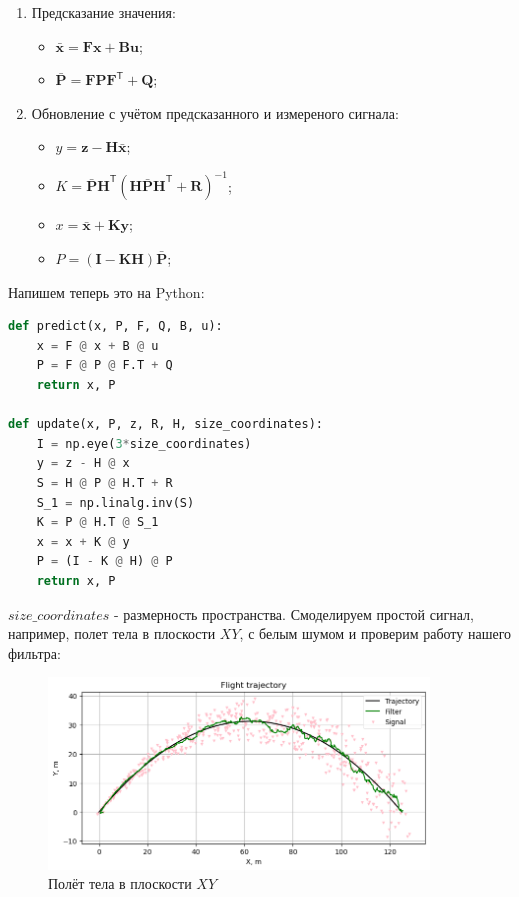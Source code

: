 \documentclass[a4paper,11pt]{article} %
\begin{document}
\begin{enumerate}
\item Предсказание значения:
\begin{itemize}
\item $\bar{\mathbf x} = \mathbf{Fx} + \mathbf{Bu}$;
\item $\bar{\mathbf P} = \mathbf{FPF}^\mathsf T + \mathbf Q$;
\end{itemize}
\item Обновление с учётом предсказанного и измереного сигнала:
\begin{itemize}
\item $y = \mathbf z - \mathbf{H\bar x}$;
\item $K = \mathbf{\bar{P}H}^\mathsf T (\mathbf{H\bar{P}H}^\mathsf T + \mathbf R)^{-1}$;
\item $x = \bar{\mathbf x} + \mathbf{Ky}$;
\item $P = (\mathbf I - \mathbf{KH})\mathbf{\bar{P}}$;
\end{itemize}
\end{enumerate}
Напишем теперь это на Python:
\begin{lstlisting}[label=some-code,caption=Filter Kalman, language=Python]
def predict(x, P, F, Q, B, u):
    x = F @ x + B @ u
    P = F @ P @ F.T + Q
    return x, P

def update(x, P, z, R, H, size_coordinates):
    I = np.eye(3*size_coordinates)
    y = z - H @ x
    S = H @ P @ H.T + R
    S_1 = np.linalg.inv(S)
    K = P @ H.T @ S_1
    x = x + K @ y
    P = (I - K @ H) @ P
    return x, P
\end{lstlisting}
$size\_coordinates$ - размерность пространства.
\newpage
Смоделируем простой сигнал,  например, полет тела в плоскости $XY$,  с белым шумом и проверим работу нашего фильтра:
\begin{figure}[h!]
\begin{center}
\includegraphics[width=0.9\textwidth]{images/kalmanfilter1.png}
\end{center}
\caption{Полёт тела в плоскости $XY$} \label{kalman1}
\end{figure}
\end{document}
